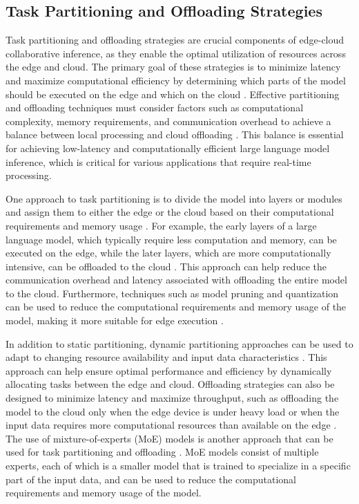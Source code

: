 \documentclass[11pt,a4paper]{article}
\begin{document}
\subsection{Task Partitioning and Offloading Strategies}


Task partitioning and offloading strategies are crucial components of edge-cloud collaborative inference, as they enable the optimal utilization of resources across the edge and cloud. The primary goal of these strategies is to minimize latency and maximize computational efficiency by determining which parts of the model should be executed on the edge and which on the cloud \cite{arxiv:2405.14636}. Effective partitioning and offloading techniques must consider factors such as computational complexity, memory requirements, and communication overhead to achieve a balance between local processing and cloud offloading \cite{doi:10.1109/twc.2022.3165824}. This balance is essential for achieving low-latency and computationally efficient large language model inference, which is critical for various applications that require real-time processing.

One approach to task partitioning is to divide the model into layers or modules and assign them to either the edge or the cloud based on their computational requirements and memory usage \cite{arxiv:2405.14371}. For example, the early layers of a large language model, which typically require less computation and memory, can be executed on the edge, while the later layers, which are more computationally intensive, can be offloaded to the cloud \cite{arxiv:2412.15304}. This approach can help reduce the communication overhead and latency associated with offloading the entire model to the cloud. Furthermore, techniques such as model pruning and quantization can be used to reduce the computational requirements and memory usage of the model, making it more suitable for edge execution \cite{doi:10.18653/v1/2020.findings-emnlp.286}.

In addition to static partitioning, dynamic partitioning approaches can be used to adapt to changing resource availability and input data characteristics \cite{arxiv:2406.02616}. This approach can help ensure optimal performance and efficiency by dynamically allocating tasks between the edge and cloud. Offloading strategies can also be designed to minimize latency and maximize throughput, such as offloading the model to the cloud only when the edge device is under heavy load or when the input data requires more computational resources than available on the edge \cite{doi:10.1109/access.2025.3592308}. The use of mixture-of-experts (MoE) models is another approach that can be used for task partitioning and offloading \cite{arxiv:1701.06538}. MoE models consist of multiple experts, each of which is a smaller model that is trained to specialize in a specific part of the input data, and can be used to reduce the computational requirements and memory usage of the model.
\end{document}
